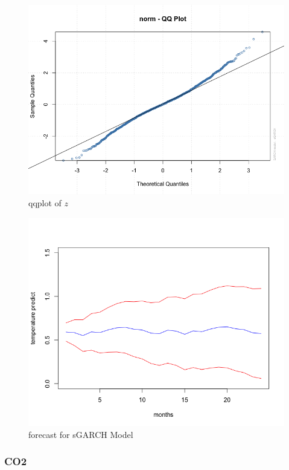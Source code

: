 \documentclass[a4paper,11pt]{article}
\begin{document}
\begin{figure}[H]
\centering
\caption{qqplot of $z$}
\includegraphics[scale=.50]{qqplot.png}
\end{figure}

\begin{figure}[H]
\centering
\caption{forecast for sGARCH Model}
\includegraphics[scale=.50]{predict01.png}
\end{figure}

\subsubsection{CO2}
\end{document}
